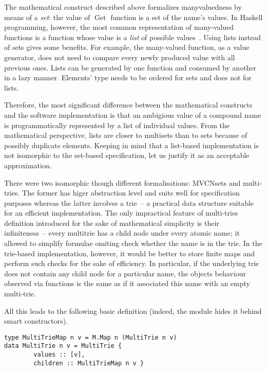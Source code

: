 \documentclass{article}
\theoremstyle{definition}
\newcommand{\deref}{\operatorname{Get}}
\begin{document}
The mathematical construct described above formalizes manyvaluedness by means
of a \emph{set}: the value of $\deref$ function is a set of the name's values.
In Haskell programming, however, the most common representation of many-valued
functions is a function whose value is a \emph{list} of possible
values~\cite[p.~285]{bib:lipovaca}.  Using lists instead of sets gives some
benefits. For example, the many-valued function, as a value generator, does not
need to compare every newly produced value with all previous ones. Lists can be
generated by one function and consumed by another in a lazy manner. Elements'
type needs to be ordered for sets and does not for lists.

Therefore, the most significant difference between the mathematical constructs
and the software implementation is that an ambigious value of a compound name is
programmatically represented by a list of individual values.  From the
mathematical perspective, lists are closer to multisets than to sets because of
possibly duplicate elements.  Keeping in mind that a list-based implementation
is not isomorphic to the set-based specification, let us justify it as an
acceptable approximation.

There were two isomorphic though different formalisations: MVCNsets and
multi-tries. The former has higer abstraction level and suits well for
specification purposes whereas the latter involves a trie~-- a practical data
structure suitable for an efficient implementation. The only impractical
feature of multi-tries definition introduced for the sake of mathematical
simplicity is their infiniteness~-- every multitrie has a child node under
every atomic name; it allowed to simplify formulae omiting check whether the
name is in the trie.  In the trie-based implementation, however, it would be
better to store finite maps and perform such checks for the sake of efficiency.
In particular, if the underlying trie does not contain any child node for a
particular name, the objects behaviour observed via functions is the same as
if it associated this name with an empty multi-trie.

All this leads to the following basic definition (indeed, the module hides it
behind smart constructors).

\begin{lstlisting}
type MultiTrieMap n v = M.Map n (MultiTrie n v) 
data MultiTrie n v = MultiTrie {
        values :: [v],
        children :: MultiTrieMap n v }
\end{lstlisting}
\end{document}
